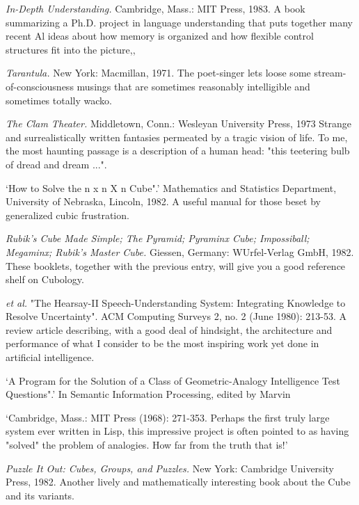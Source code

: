  {\sl In-Depth Understanding.} Cambridge, Mass.: MIT Press, 1983. A book summarizing a Ph.D. project in language understanding that puts together many recent Al ideas about how memory is organized and how flexible control structures fit into the picture,,

 {\sl Tarantula.} New York: Macmillan, 1971. The poet-singer lets loose some stream- of-consciousness musings that are sometimes reasonably intelligible and sometimes totally wacko.

 {\sl The Clam Theater.} Middletown, Conn.: Wesleyan University Press, 1973 Strange and surrealistically written fantasies permeated by a tragic vision of life. To me, the most haunting passage is a description of a human head: "this teetering bulb of dread and dream ...".

 `How to Solve the n x n X n Cube".' Mathematics and Statistics Department, University of Nebraska, Lincoln, 1982. A useful manual for those beset by generalized cubic frustration.

 {\sl Rubik's Cube Made Simple; The Pyramid; Pyraminx Cube; Impossiball; Megaminx; Rubik's Master Cube.} Giessen, Germany: WUrfel-Verlag GmbH, 1982. These booklets, together with the previous entry, will give you a good reference shelf on Cubology.

 {\sl et al.} "The Hearsay-II Speech-Understanding System: Integrating Knowledge to Resolve Uncertainty". ACM Computing Surveys 2, no. 2 (June 1980): 213-53. A review article describing, with a good deal of hindsight, the architecture and performance of what I consider to be the most inspiring work yet done in artificial intelligence.

 `A Program for the Solution of a Class of Geometric-Analogy Intelligence Test Questions".' In Semantic Information Processing, edited by Marvin

 `Cambridge, Mass.: MIT Press (1968): 271-353. Perhaps the first truly large system ever written in Lisp, this impressive project is often pointed to as having "solved" the problem of analogies. How far from the truth that is!' 

 {\sl Puzzle It Out: Cubes, Groups, and Puzzles.} New York: Cambridge University Press, 1982. Another lively and mathematically interesting book about the Cube and its variants.

